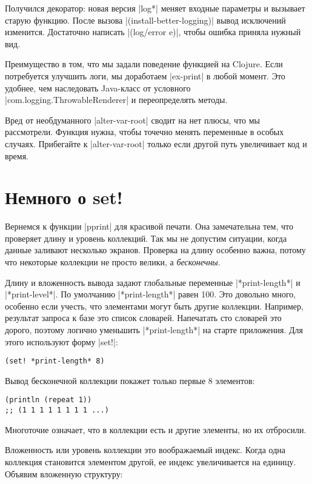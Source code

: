 Получился декоратор: новая версия \spverb|log*| меняет входные параметры и
вызывает старую функцию. После вызова \spverb|(install-better-logging)| вывод
исключений изменится. Достаточно написать \spverb|(log/error e)|, чтобы ошибка
приняла нужный вид.

Преимущество в том, что мы задали поведение функцией на Clojure. Если
потребуется улучшить логи, мы доработаем \spverb|ex-print| в любой момент. Это
удобнее, чем наследовать Java-класс от условного
\spverb|com.logging.ThrowableRenderer| и переопределять методы.

Вред от необдуманного \spverb|alter-var-root| сводит на нет плюсы, что мы
рассмотрели. Функция нужна, чтобы точечно менять переменные в особых
случаях. Прибегайте к \spverb|alter-var-root| только если другой путь
увеличивает код и время.

\section{Немного о set!}

Вернемся к функции \spverb|pprint| для красивой печати. Она замечательна тем,
что проверяет длину и уровень коллекций. Так мы не допустим ситуации, когда
данные заливают несколько экранов. Проверка на длину особенно важна, потому что
некоторые коллекции не просто велики, а \emph{бесконечны}.

Длину и вложенность вывода задают глобальные переменные \spverb|*print-length*|
и \spverb|*print-level*|. По умолчанию \spverb|*print-length*| равен 100. Это
довольно много, особенно если учесть, что элементами могут быть другие
коллекции. Например, результат запроса к базе это список словарей. Напечатать
сто словарей это дорого, поэтому логично уменьшить \spverb|*print-length*| на
старте приложения. Для этого используют форму \spverb|set!|:

\begin{verbatim}
(set! *print-length* 8)
\end{verbatim}

\noindent
Вывод бесконечной коллекции покажет только первые 8 элементов:

\begin{verbatim}
(println (repeat 1))
;; (1 1 1 1 1 1 1 1 ...)
\end{verbatim}

\noindent
Многоточие означает, что в коллекции есть и другие элементы, но их отбросили.

Вложенность или уровень коллекции это воображаемый индекс. Когда одна коллекция
становится элементом другой, ее индекс увеличивается на единицу. Объявим
вложенную структуру:

